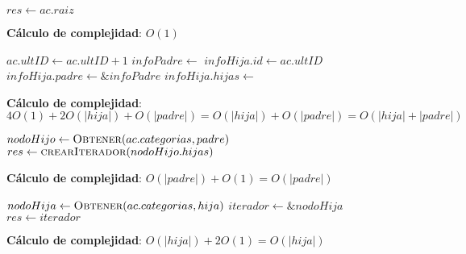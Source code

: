 \documentclass[10pt, a4paper]{article}
\let\TipoVariable=\texttt
\let\ModificadorArgumento=\textbf
\newcommand{\In}[2]{\ModificadorArgumento{in} \ensuremath{#1}\,: \TipoVariable{#2}\xspace}
\newcommand{\Inout}[2]{\ModificadorArgumento{in/out} \ensuremath{#1}\,: \TipoVariable{#2}\xspace}
\newcommand{\DRef}{\ensuremath{\rightarrow}}
\begin{document}
\begin{algorithm}[H]
\caption*{iRaiz(\In{ac}{abCat}) $\DRef res$ : \TipoVariable{categoria}}
\begin{algorithmic}[1]
	\State $res \gets ac.raiz$
\end{algorithmic}
\textbf{C\'alculo de complejidad}: $O(1)$
\end{algorithm}

\begin{algorithm}[H]
\caption*{iAgregar(\Inout{ac}{abCat}, \In{padre}{categoria}, \In{hija}{categoria})}
\begin{algorithmic}[1]
	\State $ac.ultID \gets ac.ultID + 1$
	\State $infoPadre \gets$ 
	\Statex
	\State $infoHija.id \gets ac.ultID$
	\State $infoHija.padre \gets \&infoPadre$
	\State $infoHija.hijas \gets$ 
	\State {}
	\Statex
	\State {}
\end{algorithmic}
\textbf{C\'alculo de complejidad}: $4O(1) + 2O(|hija|) + O(|padre|) = O(|hija|) + O(|padre|) = O(|hija| + |padre|)$
\end{algorithm}

\begin{algorithm}[H]
\caption*{iHijas(\In{ac}{abCat}, \In{padre}{categoria}) $\DRef res$ : \TipoVariable{iteradorUni(categoria)}}
\begin{algorithmic}[1]
    \State $nodoHijo \gets \Call{Obtener}{ac.categorias, padre}$
	\State $res \gets \Call{crearIterador}{nodoHijo.hijas}$
\end{algorithmic}
\textbf{C\'alculo de complejidad}: $O(|padre|) + O(1) = O(|padre|)$
\end{algorithm}

\begin{algorithm}[H]
\caption*{iPadres(\In{ac}{abCat}, \In{hija}{categoria}) $\DRef res$ : \TipoVariable{itAbCat}}
\begin{algorithmic}[1]
    \State $nodoHija \gets \Call{Obtener}{ac.categorias, hija}$
    \State $iterador \gets \&nodoHija$
    \State $res \gets iterador$
\end{algorithmic}
\textbf{C\'alculo de complejidad}: $O(|hija|) + 2O(1) = O(|hija|)$
\end{algorithm}
\end{document}

